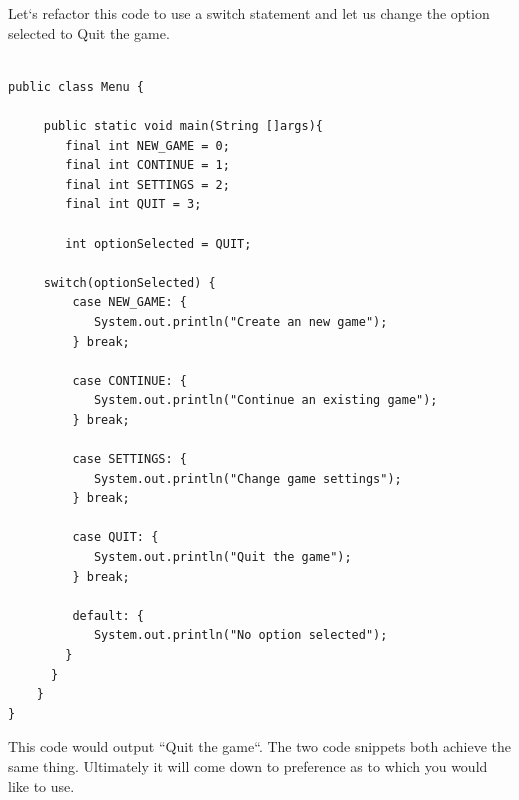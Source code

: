 \documentclass[11]{article}
\begin{document}
Let`s refactor this code to use a switch statement and let us change the option selected to Quit the game.
\begin{lstlisting}

public class Menu {

     public static void main(String []args){
        final int NEW_GAME = 0;
        final int CONTINUE = 1;
        final int SETTINGS = 2;
        final int QUIT = 3;
        
        int optionSelected = QUIT;
     
     switch(optionSelected) {
         case NEW_GAME: {
            System.out.println("Create an new game");
         } break;
         
         case CONTINUE: {
            System.out.println("Continue an existing game");
         } break;
         
         case SETTINGS: {
            System.out.println("Change game settings");
         } break;
         
         case QUIT: {
            System.out.println("Quit the game");
         } break;
         
         default: {
            System.out.println("No option selected");
        }
      }
    }
}
\end{lstlisting}

This code would output ``Quit the game``. The two code snippets both achieve the same thing. Ultimately it will come down to preference as to which you would like to use.
\end{document}
